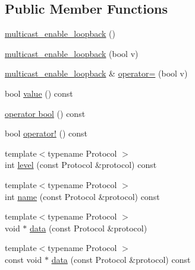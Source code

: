 \subsection*{Public Member Functions}
\begin{DoxyCompactItemize}
\item 
\hyperlink{classasio_1_1ip_1_1detail_1_1socket__option_1_1multicast__enable__loopback_a292231060ae9fe93147db3a73fdad791}{multicast\+\_\+enable\+\_\+loopback} ()
\item 
\hyperlink{classasio_1_1ip_1_1detail_1_1socket__option_1_1multicast__enable__loopback_ac4f8e71c91e17724fdd5a6f7bd4022ce}{multicast\+\_\+enable\+\_\+loopback} (bool v)
\item 
\hyperlink{classasio_1_1ip_1_1detail_1_1socket__option_1_1multicast__enable__loopback}{multicast\+\_\+enable\+\_\+loopback} \& \hyperlink{classasio_1_1ip_1_1detail_1_1socket__option_1_1multicast__enable__loopback_ae55d443e3cc3c4fd76d32a82584d50b5}{operator=} (bool v)
\item 
bool \hyperlink{classasio_1_1ip_1_1detail_1_1socket__option_1_1multicast__enable__loopback_a7440a84688997d4e5874171bd55053c3}{value} () const 
\item 
\hyperlink{classasio_1_1ip_1_1detail_1_1socket__option_1_1multicast__enable__loopback_a083409c40fd545bb130b7f2c57dd9d3a}{operator bool} () const 
\item 
bool \hyperlink{classasio_1_1ip_1_1detail_1_1socket__option_1_1multicast__enable__loopback_a4e59709b5a6eef4a55232baa70153f9e}{operator!} () const 
\item 
{\footnotesize template$<$typename Protocol $>$ }\\int \hyperlink{classasio_1_1ip_1_1detail_1_1socket__option_1_1multicast__enable__loopback_aa9bab7b77ceef96d2302c9ae1c02ce91}{level} (const Protocol \&protocol) const 
\item 
{\footnotesize template$<$typename Protocol $>$ }\\int \hyperlink{classasio_1_1ip_1_1detail_1_1socket__option_1_1multicast__enable__loopback_a8b9efcc1c7e3a8e2670d2247af9a71ce}{name} (const Protocol \&protocol) const 
\item 
{\footnotesize template$<$typename Protocol $>$ }\\void $\ast$ \hyperlink{classasio_1_1ip_1_1detail_1_1socket__option_1_1multicast__enable__loopback_a4092d5d021e0cd909533ef84c05a679c}{data} (const Protocol \&protocol)
\item 
{\footnotesize template$<$typename Protocol $>$ }\\const void $\ast$ \hyperlink{classasio_1_1ip_1_1detail_1_1socket__option_1_1multicast__enable__loopback_a6d132bbfca75b38061e90db2a86828ea}{data} (const Protocol \&protocol) const 

\end{DoxyCompactItemize}
